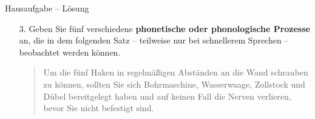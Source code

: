 \begin{frame}{Hausaufgabe -- Lösung}

\begin{itemize}
\item[3.]{Geben Sie fünf verschiedene \textbf{phonetische oder phonologische Prozesse} an, die in dem folgenden Satz -- teilweise nur bei schnellerem Sprechen -- beobachtet werden können.} 

\begin{exe}
	\begin{quote}
	Um die fünf Haken in regelmäßigen Abständen an die Wand schrauben zu können, sollten Sie sich Bohrmaschine, Wasserwaage, Zollstock und Dübel bereitgelegt haben und auf keinen Fall die Nerven verlieren, bevor Sie nicht befestigt sind.
	\end{quote}
\end{exe}


\begin{description}
	\item[] ~

		\end{description}

\end{itemize}

\end{frame}


